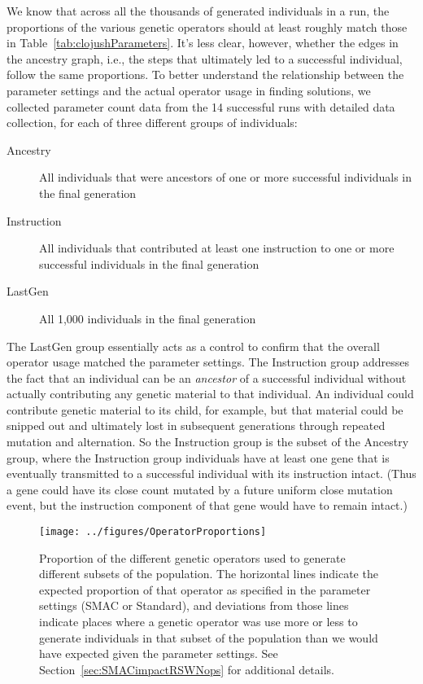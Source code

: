 We know that across all the thousands of generated individuals in a run,
the proportions of the various genetic operators should at least roughly
match those in Table~\ref{tab:clojushParameters}. It's less clear, however,
whether the edges in the ancestry graph, i.e., the steps that ultimately led
to a successful individual, follow the same proportions. To better understand
the relationship between the parameter settings and the actual operator usage
in finding solutions, we collected parameter count data from the 14 successful
runs with detailed data collection, for each of three different 
groups of individuals:
\begin{description}
	\item[Ancestry] All individuals that were ancestors of one or more successful
	individuals in the final generation
	\item[Instruction] All individuals that contributed at least one instruction to
	one or more successful individuals in the final generation
	\item[LastGen] All 1,000 individuals in the final generation
\end{description}
The LastGen group essentially acts as a control to confirm that 
the overall operator usage matched the parameter settings. The Instruction group
addresses the fact that an individual can be an \emph{ancestor} of a
successful individual without actually contributing any genetic material
to that individual. An individual could contribute genetic material to its
child, for example, but that material could be snipped out and 
ultimately lost in subsequent
generations through repeated mutation and alternation. So the Instruction
group is the subset of the Ancestry group, where the Instruction group 
individuals have
at least one gene that is eventually transmitted to a successful individual
with its instruction intact. (Thus a gene could have its close count mutated
by a future uniform close mutation event, but the instruction component of
that gene would have to remain intact.)

\begin{figure*}
	\texttt{[image: ../figures/OperatorProportions]}
	\caption{Proportion of the different genetic operators used to
	generate different subsets of the population. The horizontal lines 
	indicate the expected proportion of that operator as specified in 
	the parameter settings (SMAC or Standard), and deviations from those
	lines indicate places where a genetic operator was use more or less
	to generate individuals in that subset of the population 
	than we would have expected given the parameter settings. See 
	Section~\ref{sec:SMACimpactRSWNops} for additional details.}
	\label{fig:opProportions}
\end{figure*}

